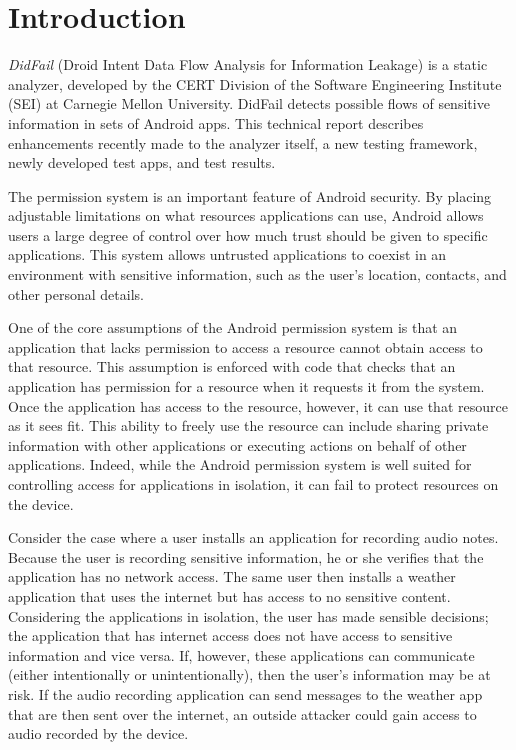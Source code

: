 \makeatletter
\patchcmd{\chapter}{\if@openright\cleardoublepage\else\clearpage\fi}{\vspace{1in}}{}{}
\makeatother

\nonfrenchspacing

\chapter{Introduction}
\label{sec:intro}
\textit{DidFail} (Droid Intent Data Flow Analysis for Information Leakage) is
a static analyzer, developed by the CERT Division of the Software Engineering Institute (SEI) at Carnegie Mellon University. DidFail detects possible flows of sensitive
information in sets of Android apps. 
This technical report describes enhancements recently made to the analyzer
itself, a new testing framework, newly developed test apps, and test results. 

The permission system is an important feature of Android security. By placing adjustable limitations on what resources applications can use, Android allows users a large degree of control over how much trust should be given to specific applications. This system allows untrusted applications to coexist in an environment with sensitive information, such as the user's location, contacts, and other personal details.

One of the core assumptions of the Android permission system is that an application that lacks permission to access a resource cannot obtain access to that resource. This assumption is enforced with code that checks that an application has permission for a resource when it requests it from the system. Once the application has access to the resource, however, it can use that resource as it sees fit. This ability to freely use the resource can include sharing private information with other applications or executing actions on behalf of other applications. Indeed, while the Android permission system is well suited for controlling access for applications in isolation, it can fail to protect resources on the device.

Consider the case where a user installs an application for recording audio notes. Because the user is recording sensitive information, he or she verifies that the application has no network access. The same user then installs a weather application that uses the internet but has access to no sensitive content. Considering the applications in isolation, the user has made sensible decisions; the application that has internet access does not have access to sensitive information and vice versa. If, however, these applications can communicate (either intentionally or unintentionally), then the user's information may be at risk. If the audio recording application can send messages to the weather app that are then sent over the internet, an outside attacker could gain access to audio recorded by the device.

